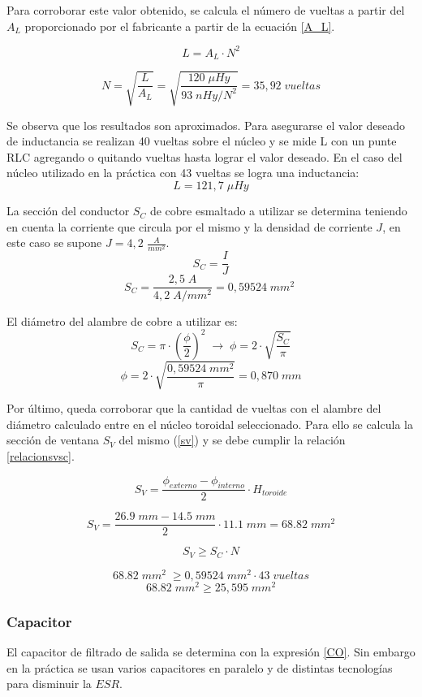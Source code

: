 \documentclass[11pt, a4paper]{article}
\begin{document}
Para corroborar este valor obtenido, se calcula el número de vueltas a partir del $A_L$ proporcionado por el fabricante a partir de la ecuación \ref{A_L}.

\begin{equation}
L = A_L \cdot N^2
\label{A_L}
\end{equation}

\[N = \sqrt{\frac{L}{A_L}} = \sqrt{\frac{120 \; \mu Hy}{93 \; nHy/N^2}} = 35,92 \; vueltas\]

Se observa que los resultados son aproximados. Para asegurarse el valor deseado de inductancia se realizan 40 vueltas sobre el núcleo y se mide L con un punte RLC agregando o quitando vueltas hasta lograr el valor deseado. En el caso del núcleo utilizado en la práctica con 43 vueltas se logra una inductancia:
\[ L = 121,7 \; \mu Hy\]

La sección del conductor $S_C$ de cobre esmaltado a utilizar se determina teniendo en cuenta la corriente que circula por el mismo y la densidad de corriente $J$, en este caso se supone $J = 4,2$ $\frac{A}{mm^2}$.
\begin{equation}
S_C = \frac{I}{J}
\label{S_C}
\end{equation}
\[S_C = \frac{2,5 \; A}{4,2 \; A/mm^2} = 0,59524 \; mm^2 \; \]

El diámetro del alambre de cobre a utilizar es:
\[S_C = \pi \cdot (\frac{\phi}{2})^2 \; \rightarrow \; \phi = 2 \cdot \sqrt{\frac{S_C}{\pi}} \]
\[\phi = 2 \cdot \sqrt{\frac{0,59524 \; mm^2}{\pi}} = 0,870 \; mm \]

Por último, queda corroborar que la cantidad de vueltas con el alambre del diámetro calculado entre en el núcleo toroidal seleccionado. Para ello se calcula la sección de ventana $S_V$ del mismo (\ref{sv}) y se debe cumplir la relación \ref{relacionsvsc}.

\begin{equation}
S_V = \frac{\phi_{externo} - \phi_{interno}}{2} \cdot H_{toroide}
\label{sv} 
\end{equation}

\[S_V = \frac{26.9 \; mm - 14.5 \; mm}{2} \cdot 11.1 \; mm = 68.82 \; mm^2\]

\begin{equation}
S_V \geq S_C \cdot N
\label{relacionsvsc}
\end{equation}

\[68.82 \; mm^2 \; \geq 0,59524 \; mm^2 \cdot 43 \; vueltas \]
\[68.82 \; mm^2 \geq 25,595 \; mm^2 \]

\subsubsection{Capacitor}
El capacitor de filtrado de salida se determina con la expresión \ref{CO}. Sin embargo en la práctica se usan varios capacitores en paralelo y de distintas tecnologías para disminuir la $ESR$.
\end{document}
